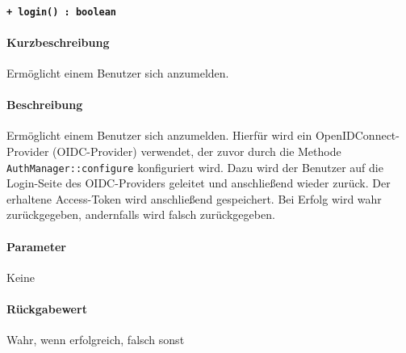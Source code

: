 \paragraph{\texttt{+ login() : boolean}}%
\paragraph*{Kurzbeschreibung}
Ermöglicht einem Benutzer sich anzumelden.
\paragraph*{Beschreibung}
Ermöglicht einem Benutzer sich anzumelden.
Hierfür wird ein OpenIDConnect-Provider (OIDC-Provider) verwendet, der zuvor durch die Methode \verb#AuthManager::configure# konfiguriert wird.
Dazu wird der Benutzer auf die Login-Seite des OIDC-Providers geleitet und anschließend wieder zurück.
Der erhaltene Access-Token wird anschließend gespeichert.
Bei Erfolg wird wahr zurückgegeben, andernfalls wird falsch zurückgegeben.
\paragraph*{Parameter}
Keine
\paragraph*{Rückgabewert}
Wahr, wenn erfolgreich, falsch sonst
